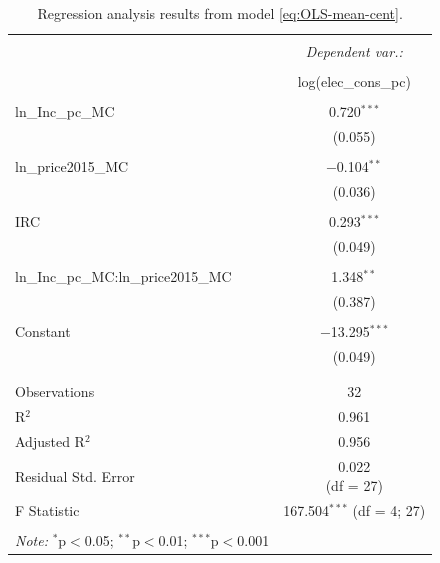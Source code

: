 \begin{table}[!htbp] \centering 
    \caption{Regression analysis results from model \eqref{eq:OLS-mean-cent}.} 
    \label{regression_good_linear} 
    \begin{tabular}{@{\extracolsep{0pt}}lc} 
        \\[-1.8ex]\hline 
        \hline \\[-1.8ex] 
         & \multicolumn{1}{c}{\textit{Dependent var.:}} \\ 
        \cline{2-2} 
        \\[-1.8ex] & log(elec\_cons\_pc) \\ 
        \hline \\[-1.8ex] 
         ln\_Inc\_pc\_MC & 0.720$^{***}$ \\ 
          & (0.055) \\ 
          & \\ 
         ln\_price2015\_MC & $-$0.104$^{**}$ \\ 
          & (0.036) \\ 
          & \\ 
         IRC & 0.293$^{***}$ \\ 
          & (0.049) \\ 
          & \\ 
         ln\_Inc\_pc\_MC:ln\_price2015\_MC & 1.348$^{**}$ \\ 
          & (0.387) \\ 
          & \\ 
         Constant & $-$13.295$^{***}$ \\ 
          & (0.049) \\ 
          & \\ 
        \hline \\[-1.8ex] 
        Observations & 32 \\ 
        R$^{2}$ & 0.961 \\ 
        Adjusted R$^{2}$ & 0.956 \\ 
        Residual Std. Error & \makecell{0.022 \\ (df = 27)} \\ 
        F Statistic & \makecell{167.504$^{***}$ \\ (df = 4; 27)} \\ 
        \hline 
        \hline \\[-1.8ex] 
        \textit{Note:} $^{*}$p$<$0.05; $^{**}$p$<$0.01; $^{***}$p$<$0.001  & \multicolumn{1}{r}{} \\ 
    \end{tabular} 
\end{table} 
        


